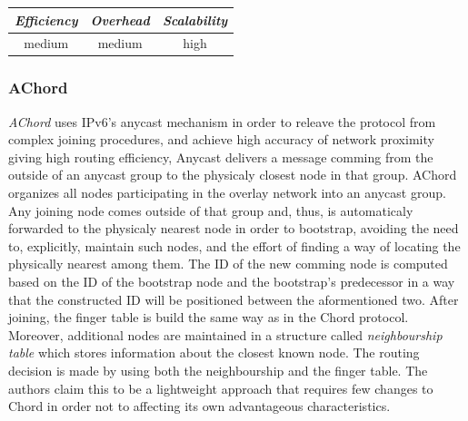 

\begin{center}
\begin{tabular}{ccc}
\emph{Efficiency} & \emph{Overhead} & \emph{Scalability} \\
\hline
medium &
medium &
high
\end{tabular}
\end{center}

\subsubsection{AChord}
\emph{AChord} \cite{dao_achord_2006} uses IPv6's anycast mechanism in order to
releave the protocol from complex joining procedures, and achieve high accuracy
of network proximity giving high routing efficiency, Anycast delivers a message
comming from the outside of an anycast group to the physicaly closest node in
that group. AChord organizes all nodes participating in the overlay network into
an anycast group. Any joining node comes outside of that group and, thus, is
automaticaly forwarded to the physicaly nearest node in order to bootstrap,
avoiding the need to, explicitly, maintain such nodes, and the effort of finding
a way of locating the physically nearest among them. The ID of the new comming
node is computed based on the ID of the bootstrap node and the bootstrap's
predecessor in a way that the constructed ID will be positioned between the
aformentioned two. After joining, the finger table is build the same way as in
the Chord protocol. Moreover, additional nodes are maintained in a structure
called \emph{neighbourship table} which stores information about the closest
known node. The routing decision is made by using both the neighbourship and
the finger table. The authors claim this to be a lightweight approach that
requires few changes to Chord in order not to affecting its own advantageous
characteristics.

